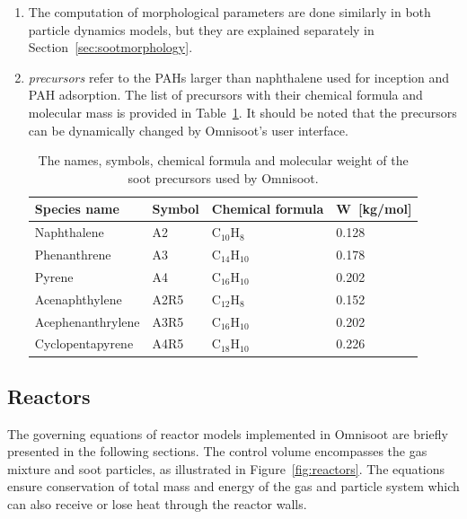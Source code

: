 \begin{enumerate}
\item The computation of morphological parameters are done similarly in both particle dynamics models, but they are explained separately in Section~\ref{sec:sootmorphology}.

\item \textit{precursors} refer to the PAHs larger than naphthalene used for inception and PAH adsorption. The list of precursors with their chemical formula and molecular mass is provided in Table~\ref{tab:precursors_list}. It should be noted that the precursors can be dynamically changed by Omnisoot's user interface.

\renewcommand{\arraystretch}{1.5}
\begin{table}
	\caption{The names, symbols, chemical formula and molecular weight of the soot precursors used by Omnisoot.}
	\label{tab:precursors_list}
	\centering
	\begin{tabular}{l l l l}
		\hline
		Species name & Symbol & Chemical formula & W~[kg/mol] \\
		\hline
		Naphthalene       & A2   &  $\mathrm{C_{10}H_{8}}$   & 0.128 \\
		Phenanthrene      & A3   &  $\mathrm{C_{14}H_{10}}$  & 0.178 \\
		Pyrene            & A4   &  $\mathrm{C_{16}H_{10}}$  & 0.202 \\
		Acenaphthylene    & A2R5 &  $\mathrm{C_{12}H_{8}}$   & 0.152 \\
		Acephenanthrylene & A3R5 &  $\mathrm{C_{16}H_{10}}$  & 0.202 \\
		Cyclopentapyrene  & A4R5 &  $\mathrm{C_{18}H_{10}}$  & 0.226 \\
		\hline
	\end{tabular}
\end{table}

\end{enumerate}

\subsection{Reactors}

The governing equations of reactor models implemented in Omnisoot are briefly presented in the following sections. The control volume encompasses the gas mixture and soot particles, as illustrated in Figure~\ref{fig:reactors}. The equations ensure conservation of total mass and energy of the gas and particle system which can also receive or lose heat through the reactor walls.



